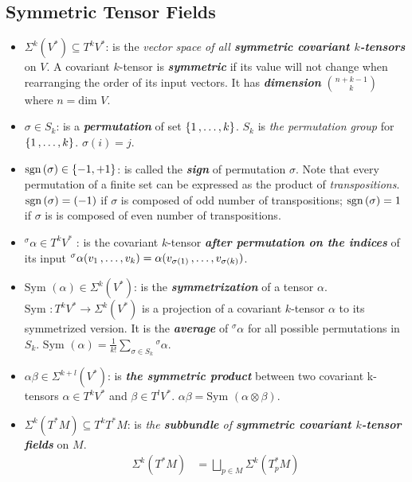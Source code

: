 \documentclass[11pt]{article}
\begin{document}
\subsection{Symmetric Tensor Fields}
\begin{itemize}
\item $\Sigma^{k}(V^{*}) \subseteq T^{k}V^{*}$: \quad is the \emph{vector space of all \textbf{symmetric covariant $k$-tensors}} on $V$. A covariant $k$-tensor is \emph{\textbf{symmetric}} if its value will not change when rearranging the order of its input vectors. It has \emph{\textbf{dimension}} $n +k -1 \choose k$ where $n = \text{dim }V$.

\item $\sigma \in S_k$: \quad is a \emph{\textbf{permutation}} of set $\left\{1 \,{,}\ldots{,}\, k\right\}$. $S_k$ is \emph{the permutation group} for $\left\{1 \,{,}\ldots{,}\, k\right\}$.  $\sigma(i) = j$. 

\item $\text{sgn}\left(\sigma\right) \in \left\{-1, +1\right\}$: \quad  is called the \emph{\textbf{sign}} of permutation $\sigma$. Note that every permutation of a finite set can be expressed as the product of \emph{transpositions}. $\text{sgn}\left(\sigma\right)=(-1)$ if $\sigma$ is composed of odd number of transpositions; $\text{sgn}\left(\sigma\right)=1$ if $\sigma$ is is composed of even number of transpositions. 

\item ${^\sigma \alpha} \in T^{k}V^{*}$ : \quad is the covariant $k$-tensor \emph{\textbf{after permutation on the indices}} of its input ${^\sigma \alpha}(v_1 \,{,}\ldots{,}\, v_k) = \alpha(v_{\sigma(1)} \,{,}\ldots{,}\, v_{\sigma(k)})$.

\item $\text{Sym }(\alpha) \in \Sigma^{k}(V^{*})$: \quad is the \emph{\textbf{symmetrization}} of a tensor $\alpha$. $\text{Sym }: T^{k}V^{*} \rightarrow \Sigma^{k}(V^{*})$ is a projection of a covariant $k$-tensor $\alpha$ to its symmetrized version. It is the \emph{\textbf{average}} of ${^\sigma \alpha}$ for all possible permutations in $S_k$. $\text{Sym }(\alpha) = \frac{1}{k!}\sum_{\sigma \in S_k}{^\sigma \alpha}$.

\item $\alpha\beta \in \Sigma^{k+l}(V^{*})$: \quad is \emph{\textbf{the symmetric product}} between two covariant k-tensors $\alpha \in T^{k}V^{*}$ and $\beta \in T^{l}V^{*}$. $\alpha\beta = \text{Sym }(\alpha \otimes \beta)$.

\item $\Sigma^{k}(T^{*}M)  \subseteq T^kT^{*}M$: \quad is \emph{the \textbf{subbundle} of \textbf{symmetric covariant $k$-tensor fields}} on $M$.
\begin{align*}
\Sigma^{k}(T^{*}M) &= \bigsqcup_{p\in M}\Sigma^{k}(T_{p}^{*}M)
\end{align*}


\end{itemize}
\end{document}
